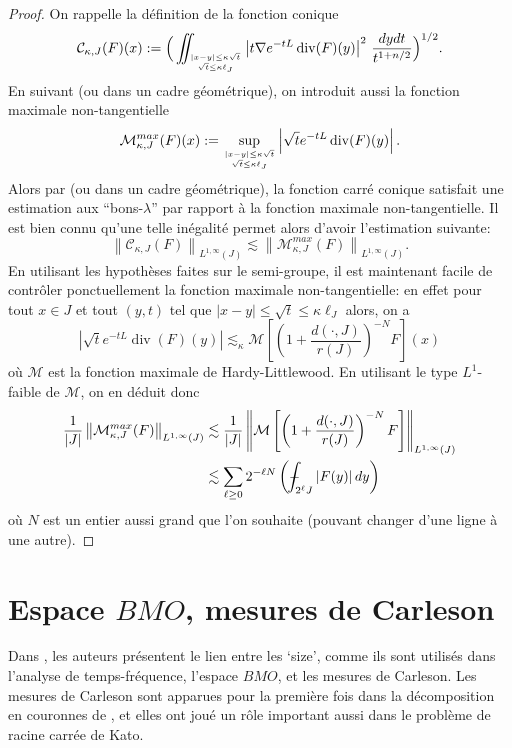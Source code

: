 \documentclass[11pt]{amsart}
\DeclareMathOperator{\dive}{div}
\def\Xint#1{\mathchoice
   {\XXint\displaystyle\textstyle{#1}}%
   {\XXint\textstyle\scriptstyle{#1}}%
   {\XXint\scriptstyle\scriptscriptstyle{#1}}%
   {\XXint\scriptscriptstyle\scriptscriptstyle{#1}}%
   \!\int}
\def\XXint#1#2#3{{\setbox0=\hbox{$#1{#2#3}{\int}$}
     \vcenter{\hbox{$#2#3$}}\kern-.5\wd0}}
\def\aver#1{\Xint-_{#1}}
\begin{document}
\begin{proof} On rappelle la d\'efinition de la fonction conique
$$ {\mathcal C}_{\kappa,J} (F)(x) := \Big(\iint_{\genfrac{}{}{0pt}{}{|x-y|\leq \kappa \sqrt{t}}{\sqrt{t}\leq \kappa \ell_J}} \left| t \nabla e^{-tL}  \dive(F)(y) \right|^2 \, \frac{dydt}{t^{1+n/2}}\Big)^{1/2}.$$
En suivant \cite{AuscherRuss} (ou \cite[Section 7.3]{AMcR} dans un cadre g\'eom\'etrique), on introduit aussi la fonction maximale non-tangentielle
$$ {\mathcal M}_{\kappa,J}^{max} (F)(x) := \sup_{\genfrac{}{}{0pt}{}{|x-y|\leq \kappa \sqrt{t}}{\sqrt{t}\leq \kappa \ell_J}}  \left|\sqrt{t} e^{-tL}  \dive(F)(y) \right|.$$
Alors par  \cite[Lemma 9]{AuscherRuss} (ou \cite[Section 7.3]{AMcR} dans un cadre g\'eom\'etrique), la fonction carr\'e conique satisfait une estimation aux ``bons-$\lambda$'' par rapport \`a la fonction maximale non-tangentielle. Il est bien connu qu'une telle in\'egalit\'e permet alors d'avoir l'estimation suivante:
$$ \left\| {\mathcal C}_{\kappa,J} (F) \right\|_{L^{1,\infty}(J)} \lesssim \left\| {\mathcal M}_{\kappa,J}^{max} (F) \right\|_{L^{1,\infty}(J)}.$$
En utilisant les hypoth\`eses faites sur le semi-groupe, il est maintenant facile de contr\^oler ponctuellement la fonction maximale non-tangentielle: en effet pour tout $x\in J$  et tout $(y,t)$ tel que $|x-y|\leq \sqrt{t} \leq \kappa \ell_J$ alors, on  a
$$ \left|\sqrt{t} e^{-tL}  \dive(F)(y) \right| \lesssim_\kappa {\mathcal M} \left[\left(1+\frac{d(\cdot,J)}{r(J)}\right)^{-N} F \right](x) $$
o\`u ${\mathcal M}$ est la fonction maximale de Hardy-Littlewood. En utilisant le type $L^1$-faible de ${\mathcal M}$, on en d\'eduit donc
\begin{align*}
 \frac{1}{|J|} \left\| {\mathcal M}_{\kappa,J}^{max} (F) \right\|_{L^{1,\infty}(J)} 
 & \lesssim \frac{1}{|J|} \left\| {\mathcal M} \left[\left(1+\frac{d(\cdot,J)}{r(J)}\right)^{-N} F \right] \right\|_{L^{1,\infty}(J)} \\
 & \lesssim  \sum_{\ell \geq 0} 2^{-\ell N} \left(\aver{2^\ell J} |F(y)| \, dy \right)
 \end{align*}
o\`u $N$ est un entier aussi grand que l'on souhaite (pouvant changer d'une ligne \`a une autre).
\end{proof}

\section{Espace $BMO$, mesures de Carleson}
\label{sec:arbres}
Dans \cite{TreesBMOCarlesonMeasures}, les auteurs pr\'esentent le lien entre les `size', comme ils sont utilis\'es dans l'analyse de temps-fr\'equence, l'espace $BMO$, et les mesures de Carleson.  Les mesures de Carleson sont apparues pour la premi\`ere fois dans la d\'ecomposition en couronnes de \cite{carleson-corona}, et elles ont jou\'e un r\^ole important aussi dans le probl\`eme de racine carr\'ee de Kato.
\end{document}
